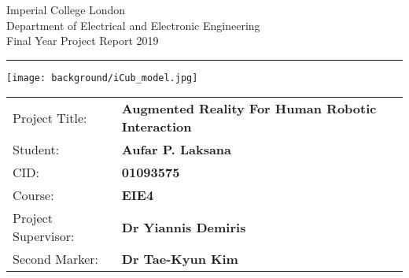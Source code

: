 \documentclass[12pt,a4paper]{report}
\begin{document}
\begin{titlepage}
	\setlength{\parindent}{0pt}
	\setlength{\parskip}{0pt}
	
	{
		\Large
		\raggedright
		Imperial College London\\[17pt]
		Department of Electrical and Electronic Engineering\\[17pt]
		Final Year Project Report 2019\\[17pt]
		
	}
	
	\rule{\columnwidth}{3pt}
	\vfill
	\centering
	\texttt{[image: background/iCub\_model.jpg]}
	\vfill
	\setlength{\tabcolsep}{0pt}
	
	\begin{tabular}{p{40mm}p{\dimexpr\columnwidth-40mm}}
		Project Title: & \textbf{Augmented Reality For Human Robotic Interaction} \\[12pt]
		Student: & \textbf{Aufar P. Laksana} \\[12pt]
		CID: & \textbf{01093575} \\[12pt]
		Course: & \textbf{EIE4} \\[12pt]
		Project Supervisor: & \textbf{Dr Yiannis Demiris} \\[12pt]
		Second Marker: & \textbf{Dr Tae-Kyun Kim} \\
	\end{tabular}
\end{titlepage}

\addvspace{6em}

\renewcommand{\abstractname}{\LARGE Abstract}

\tableofcontents
\end{document}
